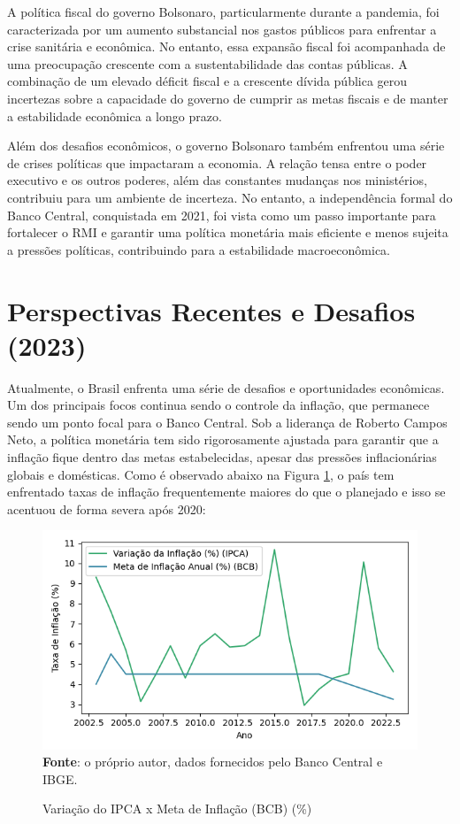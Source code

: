 \documentclass[12pt,oneside,a4paper,chapter=TITLE,english,brazil,sumario=abnt-6027-2012]{abntex2}
\begin{document}
A política fiscal do governo Bolsonaro, particularmente durante a pandemia, foi caracterizada por um aumento substancial nos gastos públicos para enfrentar a crise sanitária e econômica. No entanto, essa expansão fiscal foi acompanhada de uma preocupação crescente com a sustentabilidade das contas públicas. A combinação de um elevado déficit fiscal e a crescente dívida pública gerou incertezas sobre a capacidade do governo de cumprir as metas fiscais e de manter a estabilidade econômica a longo prazo.

Além dos desafios econômicos, o governo Bolsonaro também enfrentou uma série de crises políticas que impactaram a economia. A relação tensa entre o poder executivo e os outros poderes, além das constantes mudanças nos ministérios, contribuiu para um ambiente de incerteza. No entanto, a independência formal do Banco Central, conquistada em 2021, foi vista como um passo importante para fortalecer o RMI e garantir uma política monetária mais eficiente e menos sujeita a pressões políticas, contribuindo para a estabilidade macroeconômica.

\section{Perspectivas Recentes e Desafios (2023)}

Atualmente, o Brasil enfrenta uma série de desafios e oportunidades econômicas. Um dos principais focos continua sendo o controle da inflação, que permanece sendo um ponto focal para o Banco Central. Sob a liderança de Roberto Campos Neto, a política monetária tem sido rigorosamente ajustada para garantir que a inflação fique dentro das metas estabelecidas, apesar das pressões inflacionárias globais e domésticas. Como é observado abaixo na Figura \ref{fig:ipcatgt}, o país tem enfrentado taxas de inflação frequentemente maiores do que o planejado e isso se acentuou de forma severa após 2020:

\begin{figure}[H]
	
	\caption{Variação do IPCA x Meta de Inflação (BCB) (\%)}
	
	\includegraphics[]{fig/ibge_ipca_bcb_meta_99_23_t.png}\\
	
	\label{fig:ipcatgt}
	\footnotesize \textbf{Fonte}: o próprio autor, dados fornecidos pelo Banco Central e IBGE.
	
\end{figure}
\end{document}
